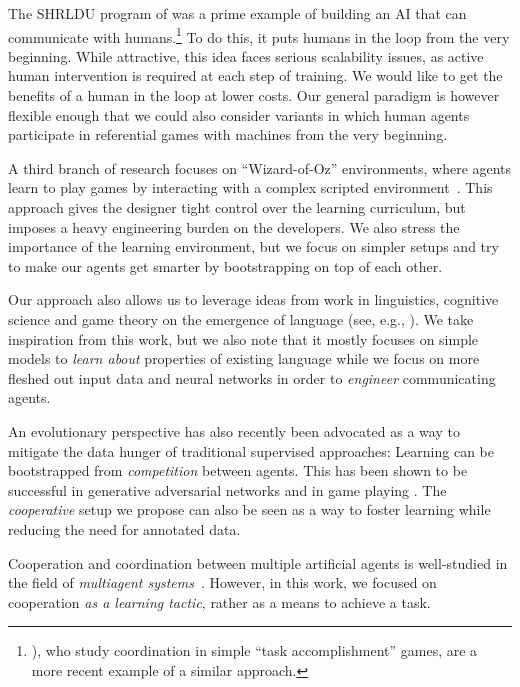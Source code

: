 The SHRLDU program of \citealt{Winograd:1971} was a prime example of
building an AI that can communicate with
humans.\footnote{\citealt{Wang:etal:2016}), who study coordination in
  simple ``task accomplishment'' games, are a more recent example of a
  similar approach.} To do this, it puts humans in the loop from the
very beginning. While attractive, this idea faces serious scalability
issues, as active human intervention is required at each step of
training. We would like to get the benefits of a human in the loop at
lower costs. Our general paradigm is however flexible enough that we
could also consider variants in which human agents participate in
referential games with machines from the very beginning.

A third branch of research focuses on ``Wizard-of-Oz'' environments,
where %
agents learn to play games by interacting with a
complex scripted environment~\citep{Mikolov:etal:2015a}. This approach
gives the designer tight control over the learning curriculum, but 
imposes a heavy engineering burden on the developers. We also stress
the importance of the learning environment, but we focus on simpler
setups and try to make our agents get smarter by bootstrapping on top
of each other.

Our approach also allows us to leverage ideas from work in
linguistics, cognitive science and game theory on the emergence of
language (see, e.g., \citealt{Wagner:etal:2003,Skyrms:2010,
  crawford1982strategic,crawford:1998survey}). We take inspiration from this work, but we also note that it mostly focuses on simple models to \textit{learn about} properties of existing language while we focus on more fleshed out input data and neural networks in order to \textit{engineer} communicating agents.

An evolutionary perspective has also recently been advocated as a way
to mitigate the data hunger of traditional supervised approaches:
Learning can be bootstrapped from \emph{competition} between
agents. This has been shown to be successful in generative adversarial
networks \citep{Goodfellow:etal:2014} and in game playing
\citep{Silver:etal:2016}. The \emph{cooperative} setup we propose can
also be seen as a way to foster learning while reducing the need for
annotated data.  

Cooperation and coordination between multiple artificial agents is well-studied in the field of \textit{multiagent systems}~\cite{Shoham:LeytonBrown:2009}. However, in this work, we focused on cooperation \textit{as a learning tactic}, rather as a means to achieve a task.  

